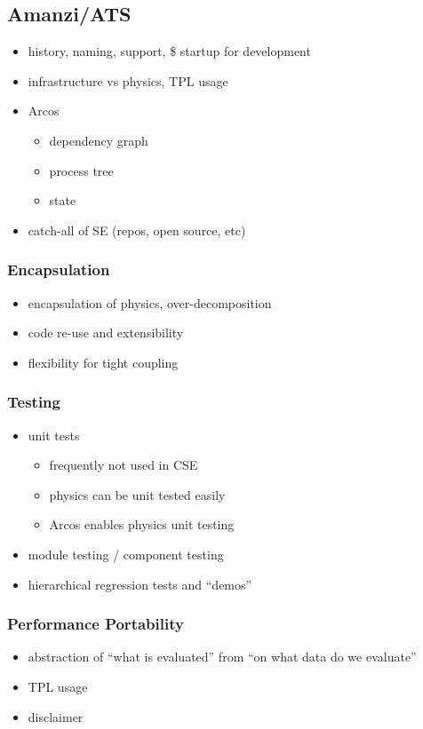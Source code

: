 \subsection{Amanzi/ATS}
\label{sec:amanzi}
%
\begin{itemize}
\item history, naming, support, \$ startup for development
\item infrastructure vs physics, TPL usage
\item Arcos
  \begin{itemize}
  \item dependency graph
  \item process tree
  \item state
  \end{itemize}
\item catch-all of SE (repos, open source, etc)
\end{itemize}

\subsubsection{Encapsulation}
\label{sec:amanzi:encapsulation}
%
\begin{itemize}
\item encapsulation of physics, over-decomposition
\item code re-use and extensibility
\item flexibility for tight coupling
\end{itemize}

\subsubsection{Testing}
\label{sec:amanzi:testing}
%
\begin{itemize}
\item unit tests
  \begin{itemize}
  \item frequently not used in CSE
  \item physics can be unit tested easily
  \item Arcos enables physics unit testing
  \end{itemize}
\item module testing / component testing
\item hierarchical regression tests and ``demos''
\end{itemize}

\subsubsection{Performance Portability}
\label{sec:amanzi:performance}
%
\begin{itemize}
\item abstraction of ``what is evaluated'' from ``on what data do we evaluate''
\item TPL usage
\item disclaimer
\end{itemize}



  

  
  
